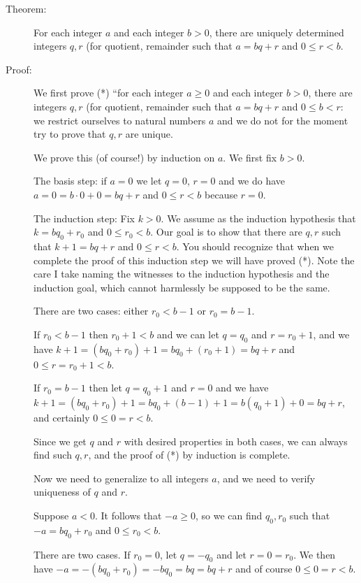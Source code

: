 \documentclass[12pt]{article}
\begin{document}
\begin{description}

\item[Theorem:]  For each integer $a$ and each integer $b >0$, there are uniquely determined integers $q,r$ (for quotient, remainder such that $a=bq+r$ and $0 \leq r<b$.

\item[Proof:]  We first prove (*) ``for each integer $a\geq  0$ and each integer $b >0$, there are integers $q,r$ (for quotient, remainder such that $a=bq+r$ and $0 \leq b <r$: we restrict ourselves to natural numbers $a$ and we do not for the moment try to prove that $q,r$ are unique.

We prove this (of course!) by induction on $a$.  We first fix $b>0$.

The basis step:  if $a=0$ we let $q=0$, $r=0$ and we do have $a=0=b\cdot 0 +0 = bq+r$ and $0 \leq r <b$ because $r=0$.

The induction step:  Fix $k>0$.  We assume as the induction hypothesis that $k=bq_0 + r_0$ and $0 \leq r_0 < b$.
Our goal is to show that there are $q,r$ such that $k+1=bq+r$ and $0\leq r <b$.  You should recognize that when we complete the proof of this induction step we will have proved (*).  Note the care I take naming the witnesses to the induction hypothesis and the induction goal, which cannot harmlessly be supposed to be the same.

There are two cases:  either $r_0 <b-1$ or $r_0 = b-1$.

If $r_0<b-1$ then $r_0+1<b$ and we can let $q=q_0$ and $r=r_0+1$, and we have $k+1 = (bq_0+r_0)+1 =
bq_0+(r_0+1) = bq+r$ and $0\leq r=r_0+1<b$.

If $r_0=b-1$ then let $q=q_0+1$ and $r=0$ and we have $k+1 = (bq_0+r_0)+1 = bq_0 +(b-1) +1 = b(q_0+1)+0=bq+r$,
and certainly $0 \leq 0=r<b$.

Since we get $q$ and $r$ with desired properties in both cases, we can always find such $q,r$, and the proof of (*) by induction is complete.

Now we need to generalize to all integers $a$, and we need to verify uniqueness of $q$ and $r$.

Suppose $a<0$.  It follows that $-a \geq 0$, so we can find $q_0,r_0$ such that $-a = bq_0+r_0$ and $0 \leq r_0 <b$.

There are two cases.  If $r_0 =0$, let $q=-q_0$ and let $r=0=r_0$.  We then have $-a = -(bq_0+r_0) = -bq_0 = bq = bq+r$
and of course $0 \leq 0 = r <b$.


\end{description}
\end{document}
